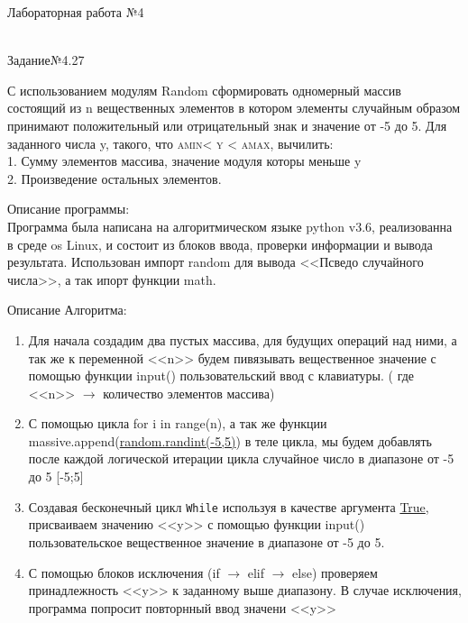 \documentclass[a4paper]{article}
\begin{document}
\newpage
Лабораторная работа №4
\\
    \begin{lab4}
        \begin{center}\underline{\hspace{6cm}}\\
        Задание№4.27\\
        \end{center}
        {\hspace{2mm}}С использованием модулям Random сформировать одномерный массив состоящий из n вещественных элементов в котором элементы случайным образом принимают положительный или отрицательный знак и значение от -5 до 5. Для заданного числа y, такого, что \textsc{amin< y < amax}, вычилить:\\
        1. Сумму элементов массива, значение модуля которы меньше y\\
        2. Произведение остальных элементов.\\
    \begin{description}
        Описание программы:\\
        Программа была написана на алгоритмическом языке python v3.6, реализованна в среде os Linux, и состоит из блоков ввода, проверки информации и вывода результата. Использован импорт random для вывода <<Псведо случайного числа>>, а так ипорт функции math.
    \end{description}
    \begin{algoritm}
        Описание Алгоритма:
        \small\begin{enumerate}
            \item
                Для начала создадим два пустых массива, для будущих операций над ними, а так же к переменной <<n>> будем пивязывать вещественное значение с помощью функции input() пользовательский ввод с клавиатуры. ( где <<n>> $\to$ количество элементов массива)
            \item
                С помощью цикла for i in range(n), а так же функции massive.append(\underline{random.randint(-5,5)}) в теле цикла, мы будем добавлять после каждой логической итерации цикла случайное число в диапазоне от -5 до 5 \textsc{[-5;5]}
            \item 
                Создавая бесконечный цикл \texttt{While} используя в качестве аргумента \underline{True}, присваиваем значению <<y>> с помощью функции input() пользовательское вещественное значение в диапазоне от -5 до 5.
            \item 
                С помощью блоков исключения (if $\to$ elif $\to$ else) проверяем принадлежность <<y>> к заданному выше диапазону. В случае исключения, программа попросит повторнный ввод значени <<y>>

\end{enumerate}
\end{algoritm}
\end{lab4}
\end{document}
